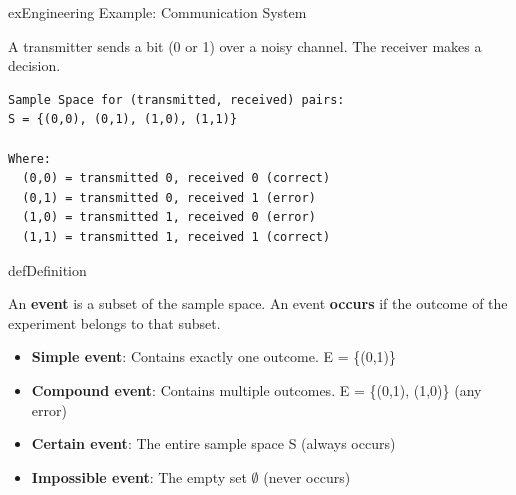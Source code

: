 \begin{PSbox}[unbreakable]{ex}{Engineering Example: Communication System}

A transmitter sends a bit (0 or 1) over a noisy channel. The receiver makes a decision.


\begin{PSplaincode}
\begin{Verbatim}
Sample Space for (transmitted, received) pairs:
S = {(0,0), (0,1), (1,0), (1,1)}

Where:
  (0,0) = transmitted 0, received 0 (correct)
  (0,1) = transmitted 0, received 1 (error)
  (1,0) = transmitted 1, received 0 (error)
  (1,1) = transmitted 1, received 1 (correct)
\end{Verbatim}
\end{PSplaincode}

\end{PSbox}


\begin{PSbox}[unbreakable]{def}{Definition}

An \textbf{event} is a subset of the sample space. An event \textbf{occurs} if the outcome of the experiment belongs to that subset.

\end{PSbox}


\begin{itemize}
\tightlist
\item
  \textbf{Simple event}: Contains exactly one outcome. E = \{(0,1)\}
\item
  \textbf{Compound event}: Contains multiple outcomes. E = \{(0,1), (1,0)\} (any error)
\item
  \textbf{Certain event}: The entire sample space S (always occurs)
\item
  \textbf{Impossible event}: The empty set \ensuremath{\emptyset} (never occurs)
\end{itemize}


